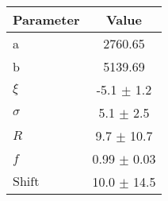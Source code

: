 \begin{table}
    \centering
    \begin{tabular}{lc}
        \toprule
        Parameter & Value \\
        \midrule
        a & 2760.65 \\
        b & 5139.69 \\
      $\xi$ & -5.1 $\pm$ 1.2 \\
      $\sigma$ & 5.1 $\pm$ 2.5 \\
      $R$ & 9.7 $\pm$ 10.7 \\
      $f$ & 0.99 $\pm$ 0.03 \\
      $\mathrm{Shift}$ & 10.0 $\pm$ 14.5 \\
  \bottomrule
  \end{tabular}
\end{table}
